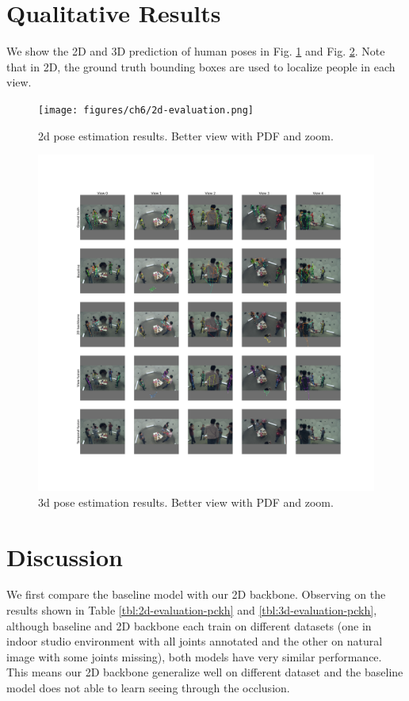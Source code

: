 \section{Qualitative Results}
We show the 2D and 3D prediction of human poses in Fig. \ref{fig:ch6-2d-evaluation} and Fig. \ref{fig:ch6-3d-evaluation}. Note that in 2D, the ground truth bounding boxes are used to localize people in each view.
\begin{figure}
	\centering
	\texttt{[image: figures/ch6/2d-evaluation.png]}
	\caption{2d pose estimation results. Better view with PDF and zoom.} 
	\label{fig:ch6-2d-evaluation}
\end{figure}

\begin{figure}
\centering
\includegraphics[width=1.0\columnwidth]{figures/ch6/3d-evaluation.png}
\caption{3d pose estimation results. Better view with PDF and zoom.} 
\label{fig:ch6-3d-evaluation}
\end{figure}

\section{Discussion}
We first compare the baseline model with our 2D backbone. Observing on the results shown in Table \ref{tbl:2d-evaluation-pckh} and \ref{tbl:3d-evaluation-pckh}, although baseline and 2D backbone each train on different datasets (one in indoor studio environment with all joints annotated and the other on natural image with some joints missing), both models have very similar performance. This means our 2D backbone generalize well on different dataset and the baseline model does not able to learn seeing through the occlusion.

